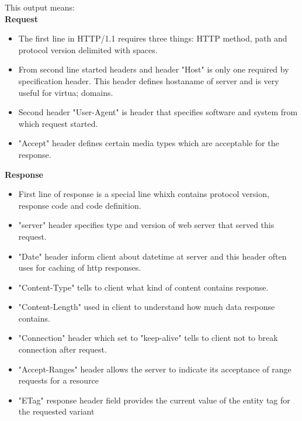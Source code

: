 \documentclass[a4paper,11pt]{article}
\begin{document}
This output means:\\
\textbf{Request}
\begin{itemize}
  \item The first line in HTTP/1.1 requires three things: HTTP method, path and protocol version delimited with spaces.
  \item From second line started headers and header "Host" is only one required by specification header. This header defines hostaname of server and is very useful for virtua; domains.
  \item Second header "User-Agent" is header that specifies software and system from which request started.
  \item "Accept" header defines certain media types which are acceptable for the response.
\end{itemize}
\textbf{Response}
\begin{itemize}
  \item First line of response is a special line whixh contains protocol version, response code and code definition.
  \item "server" header specifies type and version of web server that served this request.
  \item "Date" header inform client about datetime at server and this header often uses for caching of http responses.
  \item "Content-Type" tells to client what kind of content contains response.
  \item "Content-Length" used in client to understand how much data response contains.
  \item "Connection" header which set to "keep-alive" tells to client not to break connection after request.
  \item "Accept-Ranges" header allows the server to indicate its acceptance of range requests for a resource
  \item "ETag" response header field provides the current value of the entity tag for the requested variant
\end{itemize}
\end{document}
